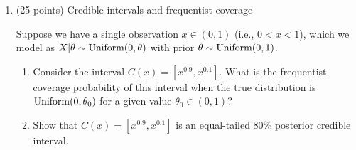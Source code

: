 \documentclass[12pt]{article}
\begin{document}
\begin{enumerate}
\newpage
\item (25 points) Credible intervals and frequentist coverage

Suppose we have a single observation $x\in(0,1)$ (i.e., $0<x<1$), which we model as $X | \theta \sim \operatorname*{Uniform}(0,\theta)$ with prior $\theta\sim \operatorname*{Uniform}(0,1)$. 

\begin{enumerate}
\setlength\itemsep{19em}
\item Consider the interval $C(x) = [x^{0.9},x^{0.1}]$. What is the frequentist coverage probability of this interval when the true distribution is $\operatorname*{Uniform}(0,\theta_0)$ for a given value $\theta_0 \in (0,1)$?
\item Show that $C(x) = [x^{0.9},x^{0.1}]$ is an equal-tailed 80\% posterior credible interval.
\end{enumerate}













    
\end{enumerate}
\end{document}
